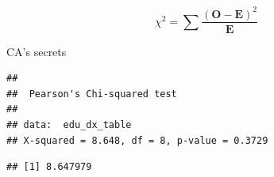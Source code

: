 \documentclass[
  ignorenonframetext,
]{beamer}
\newenvironment{Shaded}{\begin{snugshade}}{\end{snugshade}}
\newcommand{\DataTypeTok}[1]{\textcolor[rgb]{0.13,0.29,0.53}{#1}}
\newcommand{\KeywordTok}[1]{\textcolor[rgb]{0.13,0.29,0.53}{\textbf{#1}}}
\newcommand{\NormalTok}[1]{#1}
\newcommand{\OperatorTok}[1]{\textcolor[rgb]{0.81,0.36,0.00}{\textbf{#1}}}
\newcommand{\StringTok}[1]{\textcolor[rgb]{0.31,0.60,0.02}{#1}}
\begin{document}
\begin{frame}

\begingroup\Huge

\begin{equation*}
\chi^2 = \sum{\frac{(\mathbf{O} - \mathbf{E})^2}{\mathbf{E}}}
\end{equation*} \endgroup

\end{frame}

\begin{frame}[fragile]{CA's secrets}
\protect\hypertarget{cas-secrets}{}

\begin{Shaded}
\end{Shaded}

\begin{verbatim}
## 
##  Pearson's Chi-squared test
## 
## data:  edu_dx_table
## X-squared = 8.648, df = 8, p-value = 0.3729
\end{verbatim}

\begin{Shaded}
\end{Shaded}

\begin{verbatim}
## [1] 8.647979
\end{verbatim}

\end{frame}
\end{document}
